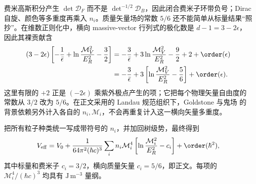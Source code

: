 \begin{derivation}
费米高斯积分产生 $\det\mathcal D_F$ 而不是 $\det^{-1/2}\mathcal D_B$，因此闭合费米子环带负号；Dirac 自旋、颜色等多重度再乘入 $n_i$。质量矢量场的常数 $5/6$ 还不能简单从标量结果“照抄”。在维数正则化中，横向 massive-vector 行列式的极化数是 $d-1=3-2\epsilon$，因此其裸贡献含
\begin{align*}
 (3-2\epsilon)
 \left[-\frac1{\bar\epsilon}
 +\ln\frac{\mathcal M_V^2}{E_R^2}-\frac32\right]
 &=-\frac3{\bar\epsilon}
 +3\ln\frac{\mathcal M_V^2}{E_R^2}
 -\frac92+2+\order(\epsilon)\\
 &=-\frac3{\bar\epsilon}
 +3\left[
 \ln\frac{\mathcal M_V^2}{E_R^2}-\frac56
 \right]+\order(\epsilon).
\end{align*}
这里有限的 $+2$ 正是 $(-2\epsilon)$ 乘紫外极点产生的项；它把每个物理矢量自由度的常数从 $3/2$ 改为 $5/6$。在正文采用的 Landau 规范组织下，Goldstone 与鬼场 的背景依赖另外计入各自的 $n_i,\mathcal M_i$，不会再重复计入这一横向矢量多重度。

把所有粒子种类统一写成带符号的 $n_i$，并加回树级势，最终得到
\begin{equation*}
 V_{\rm eff}=V_0+\frac1{64\pi^2(\hbar c)^3}
 \sum_i n_i\mathcal M_i^4
 \left[\ln\frac{\mathcal M_i^2}{E_R^2}-c_i\right]
 +\order(\hbar^2),
\end{equation*}
其中标量和费米子 $c_i=3/2$，横向质量矢量 $c_i=5/6$，即正文。每项的 $\mathcal M_i^4/(\hbar c)^3$ 均具有 $\mathrm{J\,m^{-3}}$ 量纲。
\end{derivation}

